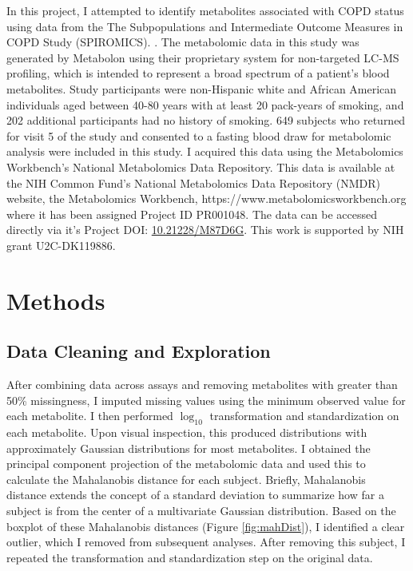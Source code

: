 \documentclass{article}
\begin{document}
In this project, I attempted to identify metabolites associated with COPD status using data from the The Subpopulations and Intermediate Outcome Measures in COPD Study (SPIROMICS). \cite{gillenwaterPlasmaMetabolomicSignatures2020}. The metabolomic data in this study was generated by Metabolon using their proprietary system for non-targeted LC-MS profiling, which is intended to represent a broad spectrum of a patient's blood metabolites. Study participants were non-Hispanic white and African American individuals aged between 40-80 years with at least 20 pack-years of smoking, and 202 additional participants had no history of smoking. 649 subjects who returned for visit 5 of the study and consented to a fasting blood draw for metabolomic analysis were included in this study. I acquired this data using the Metabolomics Workbench's National Metabolomics Data Repository. This data is available at the NIH Common Fund's National Metabolomics Data Repository (NMDR) website, the Metabolomics Workbench, https://www.metabolomicsworkbench.org where it has been assigned Project ID PR001048. The data can be accessed directly via it's Project DOI: \href{http://dx.doi.org/10.21228/M87D6G}{10.21228/M87D6G}. This work is supported by NIH grant U2C-DK119886.


\section*{Methods}
\subsection*{Data Cleaning and Exploration}
After combining data across assays and removing metabolites with greater than 50\% missingness, I imputed missing values using the minimum observed value for each metabolite. I then performed \(\log_{10}\) transformation and standardization on each metabolite. Upon visual inspection, this produced distributions with approximately Gaussian distributions for most metabolites. I obtained the principal component projection of the metabolomic data and used this to calculate the Mahalanobis distance for each subject. Briefly, Mahalanobis distance extends the concept of a standard deviation to summarize how far a subject is from the center of a multivariate Gaussian distribution. Based on the boxplot of these Mahalanobis distances (Figure \ref{fig:mahDist}), I identified a clear outlier, which I removed from subsequent analyses. After removing this subject, I repeated the transformation and standardization step on the original data.
\end{document}
